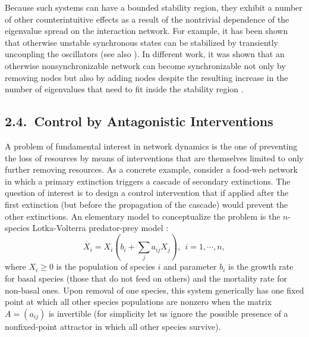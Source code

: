 \documentclass[
preprint,
superscriptaddress,
aps,
prl,
]{revtex4-1}
\begin{document}
Because such systems can have a bounded stability region, they 
{\color{black} exhibit}
a number of other counterintuitive effects 
{\color{black} as a result of}
the nontrivial dependence of the eigenvalue spread on the interaction network. For example, it has been shown that otherwise unstable synchronous states can be stabilized by transiently uncoupling the oscillators 
\cite{schroder2015transient, Schroeder2016} (see also {\color{black} \cite{ stilwell2006sufficient,Chen2009onoffcoupling,jeter2015synchronization}).}
In different work, it was shown that an otherwise nonsynchronizable network can become synchronizable not only by removing nodes but also by adding nodes despite the resulting increase in the number of eigenvalues that need to fit inside the stability region \cite{nishikawa2010network}.

\subsection{2.4.~Control by Antagonistic Interventions}

A problem of fundamental interest in network dynamics is the one of preventing the loss of resources by means of interventions that are themselves limited to only further removing resources. As a concrete example, consider a food-web network in which a primary extinction triggers a cascade of secondary extinctions. The question of interest is to design a control intervention that if applied after the first extinction (but before the propagation of the cascade) would prevent the other extinctions. An elementary model to conceptualize the problem is the $n$-species Lotka-Volterra predator-prey model \cite{cohen1990stochastic}:
\begin{equation}
\dot{X_i}=X_i \left(b_i +\sum_j a_{ij}X_j\right),  ~~ i=1,\cdots, n,
\label{eq5}
\end{equation}
where $X_i\ge 0$ is the population of species $i$ and parameter $b_i$ is the growth rate for basal species (those that do not 
  {\color{black} feed}
on others) and the mortality rate for non-basal ones. Upon removal of one species, this system generically has one fixed point at which all other species populations are nonzero when the matrix $A=(a_{ij})$ is invertible  (for simplicity let us ignore the possible presence of a 
nonfixed-point
 attractor in which all other species survive).  
\end{document}
